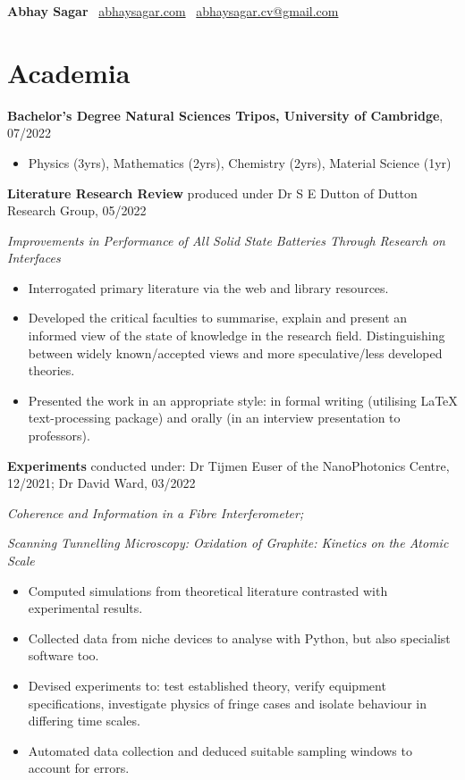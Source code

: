 \documentclass[a4paper]{article}
\begin{document}
\begin{center}
	{\huge\textbf{Abhay Sagar}}
	\textbar \ \href{https://www.abhaysagar.com}{abhaysagar.com} \textbar \ \href{mailto:abhaysagar.cv@gmail.com}{abhaysagar.cv@gmail.com}
\end{center}



\section{Academia}
\textbf{Bachelor's Degree Natural Sciences Tripos, University of Cambridge}, 07/2022

\begin{itemize}
	\item[]Physics (3yrs), Mathematics (2yrs), Chemistry (2yrs), Material Science (1yr)
\end{itemize}

\noindent\textbf{Literature Research Review} produced under Dr S E Dutton of Dutton Research Group, 05/2022

\textit{Improvements in Performance of All Solid State Batteries Through Research on Interfaces}

\begin{itemize}
	\item Interrogated primary literature via the web and library resources.
	\item Developed the critical faculties to summarise, explain and present an informed view of the state of knowledge in the research field. Distinguishing between widely known/accepted views and more speculative/less developed theories.
	\item Presented the work in an appropriate style: in formal writing (utilising LaTeX text-processing package) and orally (in an interview presentation to professors).
\end{itemize}


\noindent\textbf{Experiments} conducted under: Dr Tijmen Euser of the NanoPhotonics Centre, 12/2021; Dr David Ward, 03/2022

\textit{Coherence and Information in a Fibre Interferometer;}

\textit{Scanning Tunnelling Microscopy: Oxidation of Graphite: Kinetics on the Atomic Scale}

\begin{itemize}
	\item Computed simulations from theoretical literature contrasted with experimental results.
	\item Collected data from niche devices to analyse with Python, but also specialist software too.
	\item Devised experiments to: test established theory, verify equipment specifications, investigate physics of fringe cases and isolate behaviour in differing time scales.
	\item Automated data collection and deduced suitable sampling windows to account for errors.
\end{itemize}
\end{document}
